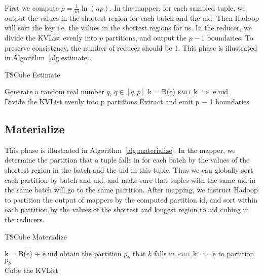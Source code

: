 \documentclass{article}
\begin{document}
First we compute $\rho=\frac{1}{m}\ln(np)$. In the mapper, for each sampled tuple, we output the values in the shortest region for each batch and the uid. Then Hadoop will sort the key i.e. the values in the shortest regions for us. In the reducer, we divide the KVList evenly into $p$ partitions, and output the $p - 1$ boundaries. To preserve consistency, the number of reducer should be 1. This phase is illustrated in Algorithm~\ref{alg:estimate}.

\begin{algorithm}[h]
\centering
\caption{TSCube Estimate}
\label{alg:estimate}
  \begin{algorithmic}[1]
      	\State Generate a random real number $q$, $q \in [q,p]$
      			\State k = B(e) 
      			\State \textsc{emit} k $\Rightarrow$ e.uid
      		\EndFor
      	\EndIf
      \EndFor
    \EndFunction
\\
      \State Divide the KVList evenly into p partitions
      \State Extract and emit p − 1 boundaries
    \EndFunction
  \end{algorithmic}
\end{algorithm}


\subsection{Materialize}

This phase is illustrated in Algorithm~\ref{alg:materialize}. In the mapper, we determine the partition that a tuple falls in for each batch by the values of the shortest region in the batch and the uid in this tuple. Thus we can globally sort each partition by batch and uid, and make sure that tuples with the same uid in the same batch will go to the same partition. After mapping, we instruct Hadoop to partition the output of mappers by the computed partition id, and sort within each partition by the values of the shortest and longest region to aid cubing in the reducers.

\begin{algorithm}[h]
\centering
\caption{TSCube Materialize}
\label{alg:materialize}
  \begin{algorithmic}[1]
      			\State k = B(e) + e.uid
      			\State obtain the partition $p_{k}$ that $k$ falls in
      			\State \textsc{emit} k $\Rightarrow$ e to partition $p_{k}$
      		\EndFor
      \EndFor
    \EndFunction
\\
      \State Cube the KVList
    \EndFunction
  \end{algorithmic}
\end{algorithm}
\end{document}
